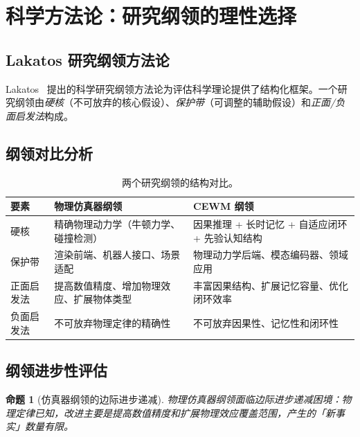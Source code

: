 \documentclass[11pt,a4paper]{article}
\newtheorem{proposition}{命题}[section]
\newcommand{\CEWM}{\textsc{CEWM}}
\begin{document}
\section{科学方法论：研究纲领的理性选择}\label{sec:methodology}

\subsection{Lakatos 研究纲领方法论}

Lakatos~\citeyearpar{lakatos1970falsification} 提出的科学研究纲领方法论为评估科学理论提供了结构化框架。一个研究纲领由\emph{硬核}（不可放弃的核心假设）、\emph{保护带}（可调整的辅助假设）和\emph{正面/负面启发法}构成。

\subsection{纲领对比分析}

\begin{table}[H]
\centering
\caption{两个研究纲领的结构对比。}\label{tab:programmes}
\small
\renewcommand{\arraystretch}{1.3}
\begin{tabularx}{\textwidth}{lXX}
\toprule
\textbf{要素} & \textbf{物理仿真器纲领} & \textbf{\CEWM{} 纲领} \\
\midrule
硬核 & 精确物理动力学（牛顿力学、碰撞检测） & 因果推理 + 长时记忆 + 自适应闭环 + 先验认知结构 \\
保护带 & 渲染前端、机器人接口、场景适配 & 物理动力学后端、模态编码器、领域应用 \\
正面启发法 & 提高数值精度、增加物理效应、扩展物体类型 & 丰富因果结构、扩展记忆容量、优化闭环效率 \\
负面启发法 & 不可放弃物理定律的精确性 & 不可放弃因果性、记忆性和闭环性 \\
\bottomrule
\end{tabularx}
\end{table}

\subsection{纲领进步性评估}

\begin{proposition}[仿真器纲领的边际进步递减]\label{prop:sim-decline}
物理仿真器纲领面临边际进步递减困境：物理定律已知，改进主要是提高数值精度和扩展物理效应覆盖范围，产生的「新事实」数量有限。
\end{proposition}
\end{document}
